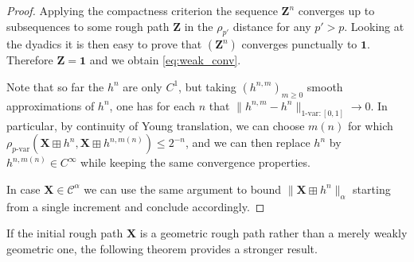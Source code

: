 \documentclass[12pt,a4paper]{article}
\numberwithin{equation}{section}
\theoremstyle{plain}
\theoremstyle{definition}
\theoremstyle{remark}
\begin{document}
\begin{proof}
Applying the compactness criterion \cite[Proposition 8.17]{frizbook} the sequence $\mathbf Z^n$ converges up to subsequences to some rough path $\mathbf{Z}$ in the $\rho_{p'}$ distance for any $p'>p$. Looking at the dyadics it is then easy to prove that $(\mathbf Z^n)$ converges punctually to $\mathbf 1$. Therefore  $\mathbf{Z}=\mathbf 1$ and we obtain \eqref{eq:weak_conv}.%

{Note that so far the $h^n$ are only $C^1$, but taking $(h^{n,m})_{m \geq 0}$ smooth approximations of $h^n$, one has for each $n$ that $\|h^{n,m} - h^n\|_{1\text{-var}:[0,1]} \to 0$. In particular, by continuity of Young translation, we can choose $m(n)$ for which $\rho_{p\text{-var}}\left( \mathbf X\boxplus h^n, \mathbf X\boxplus h^{n,m(n)}\right) \leq 2^{-n}$, and we can then replace $h^n$ by $h^{n,m(n)} \in C^{\infty}$ while keeping the same convergence properties.}  


 In case $\mathbf{X}\in\mathcal{C}^{\alpha}$ we can use the same argument to bound $\|\mathbf X\boxplus h^n\|_{\alpha}$ starting from a single increment and conclude accordingly.
\end{proof}
If the  initial rough path $\mathbf{X}$ is  a geometric rough path rather than a merely weakly geometric one, the following theorem provides a stronger result.
\end{document}
